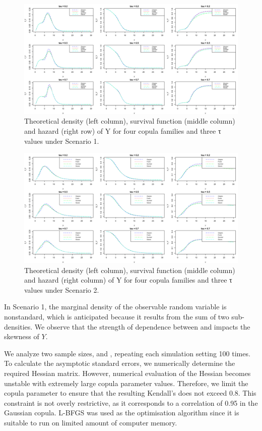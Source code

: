 \begin{figure}[!h]
	\includegraphics[width=\linewidth]{images/scenario1.png}
	\caption{Theoretical density (left column), survival function (middle column) and hazard (right row) of Y for four copula
families and three τ values under Scenario 1.}
\end{figure}

\begin{figure}
	\includegraphics[width=\linewidth]{images/scenario2.png}
	\caption{Theoretical density (left column), survival function (middle column) and hazard (right column) of Y for four copula
families and three τ values under Scenario 2.}
\end{figure}

In Scenario 1, the marginal density of the observable random variable  is nonstandard, which is anticipated because it results from the sum of two sub-densities. We observe that the strength of dependence between  and  impacts the skewness of $Y$.

We analyze two sample sizes,  and , repeating each simulation setting 100 times. To calculate the asymptotic standard errors, we numerically determine the required Hessian matrix. However, numerical evaluation of the Hessian becomes unstable with extremely large copula parameter values. Therefore, we limit the copula parameter to ensure that the resulting Kendall’s  does not exceed 0.8. This constraint is not overly restrictive, as it corresponds to a correlation of 0.95 in the Gaussian copula. L-BFGS was used as the optimisation algorithm since it is suitable to run on limited amount of computer memory.


